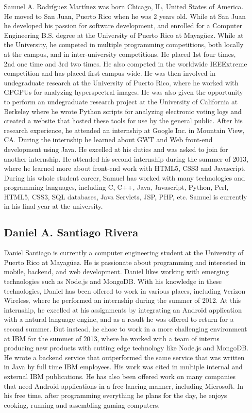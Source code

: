Samuel A. Rodríguez Martínez was born Chicago, IL, United States of America. He
moved to San Juan, Puerto Rico when he was 2 years old. While at San Juan he
developed his passion for software development, and enrolled for a Computer
Engineering B.S. degree at the University of Puerto Rico at Mayagüez. While at
the University, he competed in multiple programming competitions, both locally
at the campus, and in inter-university competitions. He placed 1st four times,
2nd one time and 3rd two times. He also competed in the worldwide IEEExtreme
competition and has placed first campus-wide. He was then involved in
undegraduate research at the University of Puerto Rico, where he worked with
GPGPUs for analyzing hyperspectral images. He was also given the opportunity to
perform an undegraduate research project at the University of California at
Berkeley where he wrote Python scripts for analyzing electronic voting logs and
created a website that hosted these tools for use by the general public. After
his research experience, he attended an internship at Google Inc. in Mountain
View, CA. During the internship he learned about GWT and Web front-end
development using Java. He excelled at his duties and was asked to join for
another internship. He attended his second internship during the summer of 2013,
where he learned more about front-end work with HTML5, CSS3 and Javascript.
During his whole student career, Samuel has worked with many technologies and
programming languages, including C, C++, Java, Javascript, Python, Perl, HTML5,
CSS3, SQL databases, Java Servlets, JSP, PHP, etc. Samuel is currently in his
final year at the university.

\subsection*{Daniel A. Santiago Rivera}

Daniel Santiago is currently a computer engineering student at the University of
Puerto Rico at Mayagüez. He is passionate about programming and interested in
mobile, backend, and web development. Daniel likes working with emerging
technologies such as Node.js and MongoDB. With his knowledge in these
technologies, Daniel has been offered to work in various places, including
Verizon Wireless, where he performed an internship during the summer of 2012. At
this internship, he excelled at his assignments by integrating an Android
application with a natural language engine, and as a result he was offered to
return for a second summer. But instead, he chose to work in a more challenging
environment at IBM for the summer of 2013, where he worked with a team of
interns producing new products with cutting edge technology like Node.js and
MongoDB. He wrote a backend service that outperformed the same service that was
written in Java by full time IBM employees. His work was cited in multiple
internal and external IBM publications. He has also been offered work on many
companies that need Android applications in a free-lancing manner, including
Microsoft. In his free time, after programming everything he plans for the day,
he enjoys cooking, running and assembling gaming computers.